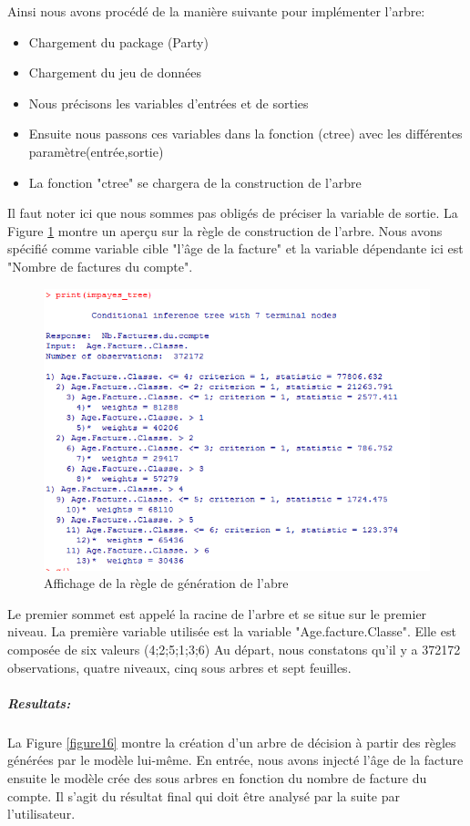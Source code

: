 \documentclass[11pt,a4paper]{report}
\begin{document}
Ainsi nous avons procédé de la manière suivante pour implémenter l'arbre: 
\begin{itemize}
\item Chargement du package (Party)
\item Chargement du jeu de données
\item Nous précisons les variables d'entrées et de sorties
\item Ensuite nous passons ces variables dans la fonction (ctree) avec les différentes paramètre(entrée,sortie)
\item La fonction "ctree" se chargera de la construction de l'arbre
\end{itemize}

Il faut noter ici que nous sommes pas obligés de préciser la variable de sortie. \newpage
La Figure \ref{figure15} montre un aperçu sur la règle de construction de l'arbre. Nous avons spécifié comme variable cible "l'âge de la facture" et la variable dépendante ici est "Nombre de factures du compte". 

\begin{figure}[h]
   \centering
   \includegraphics[scale=0.83]  {nbFacturecompte_age_factureclasse_tree_condition.PNG}
     \caption{Affichage de la règle de génération de l'abre}
     \label{figure15}
 
\end{figure}
Le premier sommet est appelé la racine de l'arbre et se situe sur le premier niveau. La première variable utilisée est la variable "Age.facture.Classe". Elle est composée de six valeurs (4;2;5;1;3;6) 
Au départ, nous constatons qu'il y a 372172 observations, quatre niveaux, cinq sous arbres et sept feuilles.  
\newpage
\subparagraph{Resultats:}
La Figure \ref{figure16} montre la création d'un arbre de décision à partir des règles générées par le modèle lui-même. En entrée, nous avons injecté l'âge de la facture ensuite le modèle crée des sous arbres en fonction du nombre de facture du compte. Il s'agit du résultat final qui doit être analysé par la suite par l'utilisateur.
\end{document}
